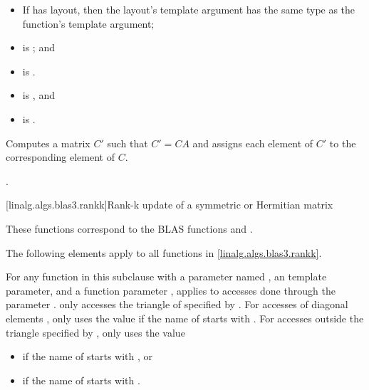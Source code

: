 \begin{itemdescr}
\pnum
\mandates
\begin{itemize}
\item
If  has  layout,
then the layout's  template argument has
the same type as the function's  template argument;
\item
{}
is ; and
\item
{} is .
\end{itemize}

\pnum
\expects
\begin{itemize}
\item
{} is , and
\item
{} is .
\end{itemize}

\pnum
\effects
Computes a matrix $C'$ such that $C' = C A$ and
assigns each element of $C'$ to the corresponding element of $C$.

\pnum
\complexity
{}.
\end{itemdescr}

[linalg.algs.blas3.rankk]{Rank-k update of a symmetric or Hermitian matrix}

\pnum
\begin{note}
These functions correspond to the BLAS functions
 and \supercite{blas3}.
\end{note}

\pnum
The following elements apply to all functions in \ref{linalg.algs.blas3.rankk}.

\pnum
For any function  in this subclause with
a parameter named ,
an  template parameter, and
a function parameter ,
 applies to accesses done through the parameter .
 only accesses the triangle of  specified by .
For accesses of diagonal elements ,
 only uses the value 
if the name of  starts with .
For accesses  outside the triangle specified by ,
 only uses the value
\begin{itemize}
\item
{}
if the name of  starts with , or
\item
{}
if the name of  starts with .
\end{itemize}

